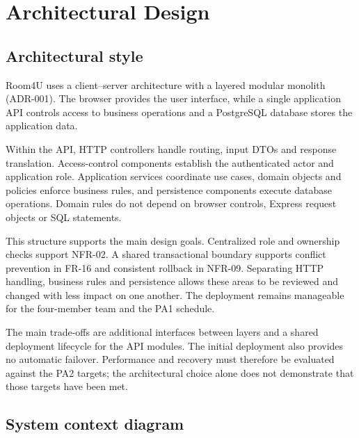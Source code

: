 

\section{Architectural Design}

\subsection{Architectural style}

Room4U uses a client–server architecture with a layered modular monolith (ADR-001). The browser provides the user interface, while a single application API controls access to business operations and a PostgreSQL database stores the application data.\par

Within the API, HTTP controllers handle routing, input DTOs and response translation. Access-control components establish the authenticated actor and application role. Application services coordinate use cases, domain objects and policies enforce business rules, and persistence components execute database operations. Domain rules do not depend on browser controls, Express request objects or SQL statements.\par

This structure supports the main design goals. Centralized role and ownership checks support NFR-02. A shared transactional boundary supports conflict prevention in FR-16 and consistent rollback in NFR-09. Separating HTTP handling, business rules and persistence allows these areas to be reviewed and changed with less impact on one another. The deployment remains manageable for the four-member team and the PA1 schedule.\par

The main trade-offs are additional interfaces between layers and a shared deployment lifecycle for the API modules. The initial deployment also provides no automatic failover. Performance and recovery must therefore be evaluated against the PA2 targets; the architectural choice alone does not demonstrate that those targets have been met.\par

\subsection{System context diagram}

